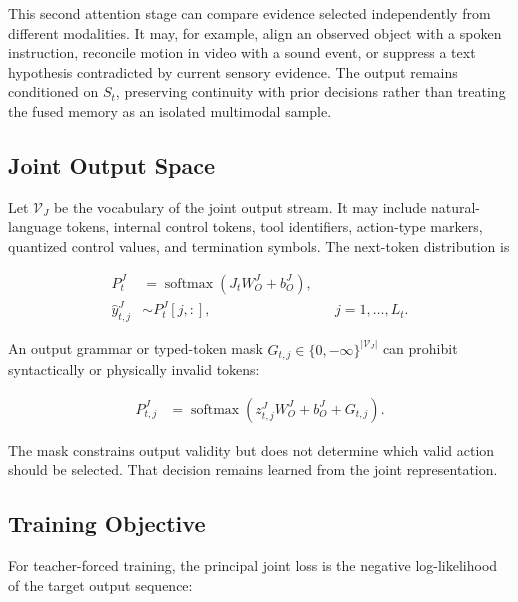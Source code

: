 This second attention stage can compare evidence selected independently from different modalities. It may, for example, align an observed object with a spoken instruction, reconcile motion in video with a sound event, or suppress a text hypothesis contradicted by current sensory evidence. The output remains conditioned on $S_t$, preserving continuity with prior decisions rather than treating the fused memory as an isolated multimodal sample.

\subsection{\textbf{Joint Output Space}}

Let $\mathcal{V}_{J}$ be the vocabulary of the joint output stream. It may include natural-language tokens, internal control tokens, tool identifiers, action-type markers, quantized control values, and termination symbols. The next-token distribution is

\begin{equation}
\begin{aligned}
    P_t^{J}
    &= \operatorname{softmax}\!\left(
       J_tW_O^{J}+b_O^{J}
       \right),\\
    \widehat{y}_{t,j}^{J}
    &\sim P_t^{J}[j,:],
    &&j=1,\ldots,L_t.
\end{aligned}
\label{eq:joint_output_head}
\end{equation}

An output grammar or typed-token mask $G_{t,j}\in\{0,-\infty\}^{|\mathcal{V}_J|}$ can prohibit syntactically or physically invalid tokens:

\begin{equation}
\begin{aligned}
    P_{t,j}^{J}
    &= \operatorname{softmax}\!\left(
       z_{t,j}^{J}W_O^{J}+b_O^{J}+G_{t,j}
       \right).
\end{aligned}
\label{eq:joint_typed_mask}
\end{equation}

The mask constrains output validity but does not determine which valid action should be selected. That decision remains learned from the joint representation.

\subsection{\textbf{Training Objective}}

For teacher-forced training, the principal joint loss is the negative log-likelihood of the target output sequence:

